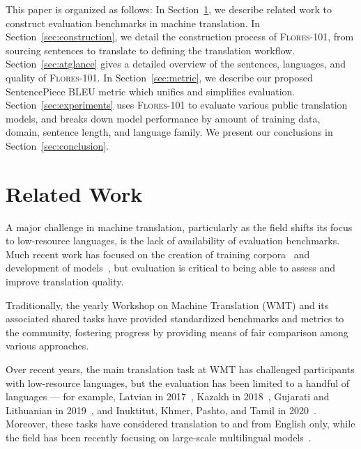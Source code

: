 This paper is organized as follows: In Section~\ref{sec:related_work}, we describe related work to construct evaluation benchmarks in machine translation. In Section~\ref{sec:construction}, we detail the construction process of \textsc{Flores-101}, 
from sourcing sentences to translate to defining the translation workflow.
Section~\ref{sec:atglance} gives a detailed overview of the sentences, languages, and quality of \textsc{Flores-101}. 
In Section~\ref{sec:metric}, we describe our proposed SentencePiece BLEU metric which unifies and simplifies evaluation. 
Section~\ref{sec:experiments} uses \textsc{Flores-101} to evaluate various public translation models, and breaks down model performance by amount of training data, domain, sentence length, and language family. We present our conclusions in Section~\ref{sec:conclusion}.

\section{Related Work} 
\label{sec:related_work}
A major challenge in machine translation, particularly as the field shifts its focus to low-resource languages, is the lack of availability of evaluation benchmarks. Much recent work has focused on the creation of training corpora~\cite{auguste2021domain,ali2021towards,adelani2021menyo,gezmu2021extended,nyoni2021low,chauhan2021monolingual} and development of models~\cite{koneru2021unsupervised,nagoudi2021indt5,aulamo2021boosting}, but evaluation is critical to being able to assess and improve translation quality.

Traditionally, the yearly Workshop on Machine Translation (WMT) and its associated shared tasks have provided standardized benchmarks and metrics to the community, fostering progress by providing means of fair comparison among various approaches. 

 Over recent years, the main translation task at WMT has challenged participants with low-resource languages, but the evaluation has been limited to a handful of languages --- for example, Latvian in 2017~\cite{ondrej2017findings}, Kazakh in 2018~\cite{rej2018findings}, Gujarati and Lithuanian in 2019~\cite{barrault2019findings}, and Inuktitut, Khmer, Pashto, and Tamil in 2020~\cite{barrault2020findings}. Moreover, these tasks have considered translation to and from English only, while the field has been recently focusing on large-scale multilingual models~\citep{gmt17,aharoni-etal-2019-massively,freitag-firat-2020-complete,fan2020beyond}.

